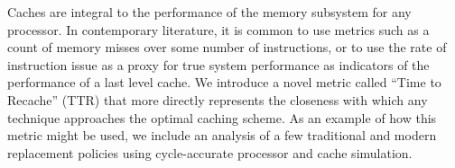 Caches are integral to the performance of the memory
subsystem for any processor.
In contemporary literature, it is common to use metrics such as a
count of memory misses over some number of instructions, or to use the
rate of instruction issue as a proxy for true system performance as
indicators of the performance of a last level cache.
We introduce a novel metric called ``Time to Recache'' (TTR) that more
directly represents the closeness with which any technique approaches
the optimal caching scheme.
As an example of how this metric might be used, we include an analysis
of a few traditional and modern replacement policies using
cycle-accurate processor and cache simulation.
